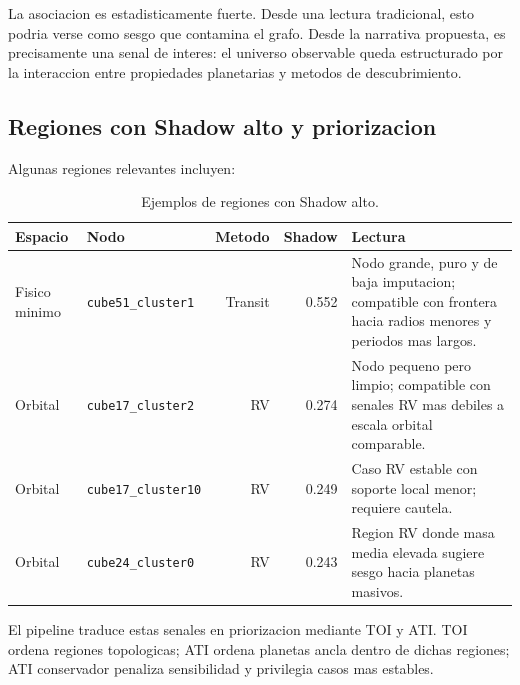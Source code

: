\documentclass[11pt]{article}
\begin{document}
La asociacion es estadisticamente fuerte. Desde una lectura tradicional, esto podria verse como sesgo que contamina el grafo. Desde la narrativa propuesta, es precisamente una senal de interes: el universo observable queda estructurado por la interaccion entre propiedades planetarias y metodos de descubrimiento.

\subsection{Regiones con Shadow alto y priorizacion}

Algunas regiones relevantes incluyen:

\begin{table}[H]
\centering
\caption{Ejemplos de regiones con Shadow alto.}
\begin{tabularx}{\linewidth}{llrrX}
\toprule
Espacio & Nodo & Metodo & Shadow & Lectura \\
\midrule
Fisico minimo & \texttt{cube51\_cluster1} & Transit & 0.552 & Nodo grande, puro y de baja imputacion; compatible con frontera hacia radios menores y periodos mas largos. \\
Orbital & \texttt{cube17\_cluster2} & RV & 0.274 & Nodo pequeno pero limpio; compatible con senales RV mas debiles a escala orbital comparable. \\
Orbital & \texttt{cube17\_cluster10} & RV & 0.249 & Caso RV estable con soporte local menor; requiere cautela. \\
Orbital & \texttt{cube24\_cluster0} & RV & 0.243 & Region RV donde masa media elevada sugiere sesgo hacia planetas masivos. \\
\bottomrule
\end{tabularx}
\end{table}

El pipeline traduce estas senales en priorizacion mediante TOI y ATI. TOI ordena regiones topologicas; ATI ordena planetas ancla dentro de dichas regiones; ATI conservador penaliza sensibilidad y privilegia casos mas estables.
\end{document}
